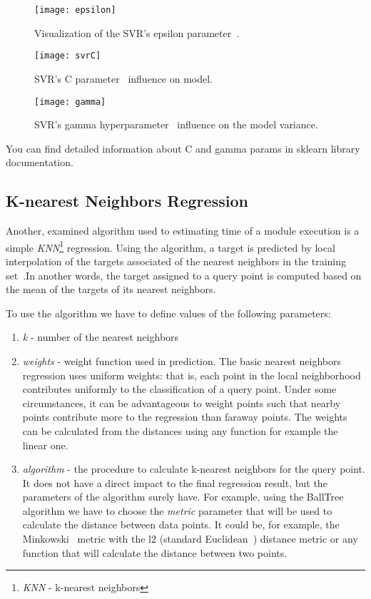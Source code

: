 \begin{figure}[!htb]
	\caption{Visualization of the SVR's epsilon parameter~.}
	\centering
	\label{fig:epsilon}
	\texttt{[image: epsilon]}
\end{figure}
\begin{figure}[!htb]
	\caption{SVR's C parameter~ influence on model.}
	\centering
	\label{fig:svrc}
	\texttt{[image: svrC]}
\end{figure}
\begin{figure}[!htb]
	\caption{SVR's gamma hyperparameter~ influence on the model variance.}
	\centering
	\label{fig:gamma}
	\texttt{[image: gamma]}
\end{figure}
You can find detailed information about C and gamma params in sklearn library documentation\cite{rbf_params}.

\subsection{K-nearest Neighbors Regression}

Another, examined algorithm used to estimating time of a module execution is a simple \textit{KNN}\footnote{\textit{KNN} - k-nearest neighbors} regression. Using the algorithm, a target is predicted by local interpolation of the targets associated of the nearest neighbors in the training set~\cite{knnreg}.In another words, the target assigned to a query point is computed based on the mean of the targets of its nearest neighbors.

To use the algorithm we have to define values of the following parameters:
\begin{enumerate}
	\item \textit{k} - number of the nearest neighbors
	\item \textit{weights} - weight function used in prediction. The basic nearest neighbors regression uses uniform weights: that is, each point in the local neighborhood contributes uniformly to the classification of a query point. Under some circumstances, it can be advantageous to weight points such that nearby points contribute more to the regression than faraway points. The weights can be calculated from the distances using any function for example the linear one.
	\item \textit{algorithm} - the procedure to calculate k-nearest neighbors for the query point. It does not have a direct impact to the final regression result, but the parameters of the algorithm surely have. For example, using the BallTree algorithm we have to choose the \textit{metric} parameter that will be used to calculate the distance between data points. It could be, for example, the Minkowski~\cite{minkowski} metric with the l2 (standard Euclidean~\cite{euclidean}) distance metric or any function that will calculate the distance between two points.
\end{enumerate}